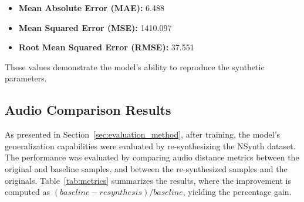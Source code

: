 \documentclass[10pt,conference]{IEEEtran}
\begin{document}
\begin{itemize}
    \item \textbf{Mean Absolute Error (MAE):} 6.488
    \item \textbf{Mean Squared Error (MSE):} 1410.097
    \item \textbf{Root Mean Squared Error (RMSE):} 37.551
\end{itemize}

These values demonstrate the model’s ability to reproduce the synthetic parameters.

\subsection{Audio Comparison Results}





As presented in Section~\ref{sec:evaluation_method}, after training, the model's generalization capabilities were evaluated by re-synthesizing the NSynth dataset. The performance was evaluated by comparing audio distance metrics between the original and baseline samples, and between the re-synthesized samples and the originals. Table~\ref{tab:metrics} summarizes the results, where the improvement is computed as \((baseline-resynthesis)/baseline \), yielding the percentage gain.
\end{document}
